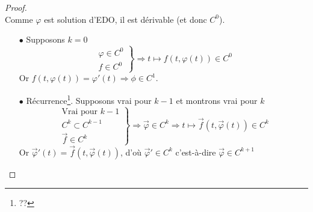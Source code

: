 \begin{proof}\ \\
	Comme $\varphi$ est solution d'EDO, il est dérivable (et donc $C^0$).\\
	\begin{itemize}
		\item[$\bullet$] Supposons $k=0$
		      \begin{equation}
		      	\left.\begin{array}{l}
		      	\varphi \in C^0\\
		      	f \in C^0
		      	\end{array}\right\} \Rightarrow t \mapsto f(t,\varphi(t)) \in C^0
		      \end{equation}
		      Or $f(t, \varphi(t)) = \varphi'(t) \Rightarrow \phi \in C^1$.
		      	
		\item[$\bullet$] Récurrence\footnote{??}. Supposons vrai pour $k-1$ et montrons vrai pour $k$
		      \begin{equation}
		      	\left.\begin{array}{l}
		      	\text{Vrai pour } k-1\\
		      	C^k \subset C^{k-1}\\
		      	\vec f \in C^k
		      	\end{array}\right\} \Rightarrow \vec \varphi \in C^k \Rightarrow 
		      	t \mapsto \vec f(t,\vec \varphi(t)) \in C^k
		      \end{equation}
		      Or $\vec \varphi'(t) = \vec{f}(t,\vec{\varphi}(t))$, d'où $\vec \varphi' 
		      \in C^k$ c'est-à-dire $\vec{\varphi}\in C^{k+1}$
	\end{itemize}
\end{proof}
	
	
